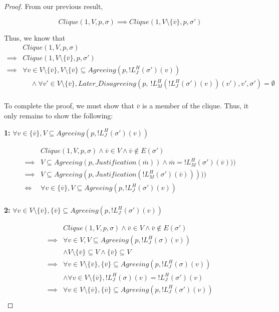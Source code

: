 \begin{proof}

From our previous result,

$$
Clique(1, V, p, \sigma) \implies Clique(1, V \setminus \{\overline{v}\}, p, \sigma')
$$


Thus, we know that
\begin{align}
        &Clique(1, V, p, \sigma) \\
\implies&Clique(1, V \setminus \{\overline{v}\}, p, \sigma') \\
\implies&\forall v \in V \setminus \{\overline{v}\}, V \setminus \{\overline{v}\} \subseteq Agreeing(p, !L^H_J(\sigma')(v)) \\
        &~~~~~\land \forall v' \in V \setminus \{\overline{v}\}, Later\_Disagreeing(p,~!L^H_M(!L^H_J(\sigma')(v))(v'), v', \sigma') = \emptyset \\
\end{align}

To complete the proof, we must show that $\overline{v}$ is a member of the clique. Thus, it only remains to show the following:

\textbf{1:} $\forall v \in \{\overline{v}\}, V \subseteq Agreeing(p, !L^H_J(\sigma')(v))$

\begin{align}
          &Clique(1, V, p, \sigma) \land \overline{v} \in V \land \overline{v} \notin E(\sigma') \\
  \implies&V \subseteq Agreeing(p, Justification(\overline{m})) \land \overline{m} = !L^H_M(\sigma')(\overline{v})))\\
  \implies&V \subseteq Agreeing(p, Justification(!L^H_M(\sigma')(\overline{v}))))) \\
  \iff& \forall v \in \{\overline{v}\}, V \subseteq Agreeing(p, !L^H_J(\sigma')(v)) \\
\end{align}

\textbf{2:} $\forall v \in V \setminus \{\overline{v}\}, \{\overline{v}\} \subseteq Agreeing(p, !L^H_J(\sigma')(v))$

\begin{align}
          &Clique(1, V, p, \sigma) \land \overline{v} \in V \land \overline{v} \notin E(\sigma') \\
  \implies&\forall v \in V, V \subseteq Agreeing(p, !L^H_J(\sigma)(v)) \\
          &\land V \setminus \{\overline{v}\} \subseteq V \land \{\overline{v}\} \subseteq V \\
  \implies&\forall v \in V \setminus \{\overline{v}\}, \{\overline{v}\} \subseteq Agreeing(p, !L^H_J(\sigma)(v)) \\
          &\land \forall v \in V \setminus \{\overline{v}\}, !L^H_J(\sigma)(v) = !L^H_J(\sigma')(v) \\
  \implies&\forall v \in V \setminus \{\overline{v}\}, \{\overline{v}\} \subseteq Agreeing(p, !L^H_J(\sigma')(v)) \\
\end{align}


\end{proof}
